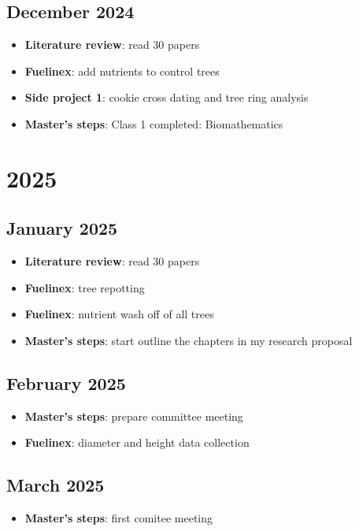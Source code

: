 \documentclass{article}
\begin{document}
\subsection {December 2024}
\begin {itemize}
	\item \textbf{Literature review}: read 30 papers
	\item \textbf{Fuelinex}: add nutrients to control trees
	\item \textbf{Side project 1}: cookie cross dating and tree ring analysis
	\item \textbf{Master's steps}: Class 1 completed: Biomathematics
\end {itemize}

\section {2025}
\subsection {January 2025}
\begin {itemize}
	\item \textbf{Literature review}: read 30 papers
	\item \textbf{Fuelinex}: tree repotting
	\item \textbf{Fuelinex}: nutrient wash off of all trees
	\item \textbf{Master's steps}: start outline the chapters in my research proposal
\end {itemize}

\subsection {February 2025}
\begin {itemize}
	\item \textbf{Master's steps}: prepare committee meeting
	\item \textbf{Fuelinex}: diameter and height data collection
\end {itemize}

\subsection {March 2025}
\begin {itemize}
	\item \textbf{Master's steps}: first comitee meeting
\end {itemize}
\end{document}
